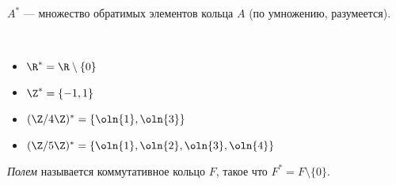 \begin{defn}
    $A^*$ --- множество обратимых элементов кольца $A$ (по умножению, разумеется).
\end{defn}

\begin{examples}~
    \begin{itemize}
        \item $\R^* = \R \setminus \{0\}$
        \item $\Z^* = \{-1, 1\}$
        \item $(\Z/4\Z)^* = \{\oln{1}, \oln{3}\}$
        \item $(\Z/5\Z)^* = \{\oln{1}, \oln{2}, \oln{3}, \oln{4}\}$
    \end{itemize}
\end{examples}

\begin{defn}
    \emph{Полем} называется коммутативное кольцо $F$, такое что $F^* = F \setminus \{0\}$.
\end{defn}
